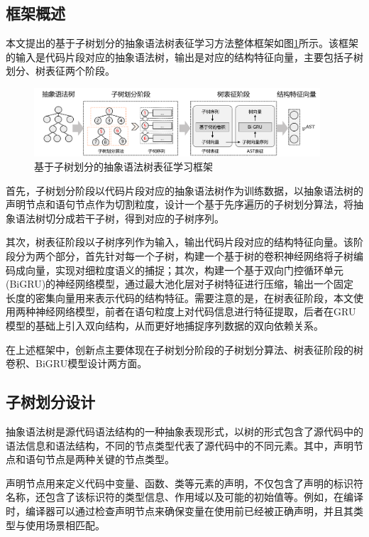 \subsection{框架概述}
\label{subsec:ASTOverview}
本文提出的基于子树划分的抽象语法树表征学习方法整体框架如图\ref{fig:astframework}所示。该框架的输入是代码片段对应的抽象语法树，输出是对应的结构特征向量，主要包括子树划分、树表征两个阶段。

\begin{figure}[H]
  \centering
  \includegraphics[width=0.95\textwidth]{figures/astframework.png}
  \caption{基于子树划分的抽象语法树表征学习框架}\label{fig:astframework}
\end{figure}

首先，子树划分阶段以代码片段对应的抽象语法树作为训练数据，以抽象语法树的声明节点和语句节点作为切割粒度，设计一个基于先序遍历的子树划分算法，将抽象语法树切分成若干子树，得到对应的子树序列。

其次，树表征阶段以子树序列作为输入，输出代码片段对应的结构特征向量。该阶段分为两个部分，首先针对每一个子树，构建一个基于树的卷积神经网络将子树编码成向量，实现对细粒度语义的捕捉；其次，构建一个基于双向门控循环单元(BiGRU)的神经网络模型，通过最大池化层对子树特征进行压缩，输出一个固定长度的密集向量用来表示代码的结构特征。需要注意的是，在树表征阶段，本文使用两种神经网络模型，前者在语句粒度上对代码信息进行特征提取，后者在GRU模型的基础上引入双向结构，从而更好地捕捉序列数据的双向依赖关系。

在上述框架中，创新点主要体现在子树划分阶段的子树划分算法、树表征阶段的树卷积、BiGRU模型设计两方面。

\subsection{子树划分设计}
\label{subsec:ASTPreModel}

抽象语法树是源代码语法结构的一种抽象表现形式，以树的形式包含了源代码中的语法信息和语法结构，不同的节点类型代表了源代码中的不同元素。其中，声明节点和语句节点是两种关键的节点类型\cite{Jo2021TwoPassTF}。

声明节点用来定义代码中变量、函数、类等元素的声明，不仅包含了声明的标识符名称，还包含了该标识符的类型信息、作用域以及可能的初始值等。例如，在编译时，编译器可以通过检查声明节点来确保变量在使用前已经被正确声明，并且其类型与使用场景相匹配。

